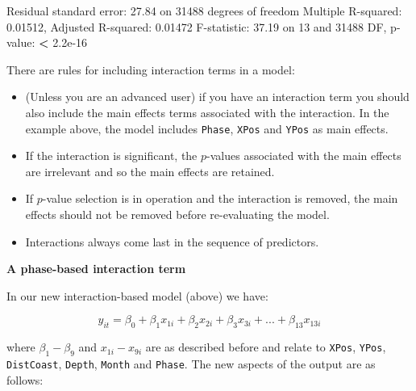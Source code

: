 \documentclass[
  oneside]{krantz}
\newenvironment{Shaded}{\begin{snugshade}}{\end{snugshade}}
\newcommand{\DecValTok}[1]{\textcolor[rgb]{0.00,0.00,0.81}{#1}}
\newcommand{\ErrorTok}[1]{\textcolor[rgb]{0.64,0.00,0.00}{\textbf{#1}}}
\newcommand{\FloatTok}[1]{\textcolor[rgb]{0.00,0.00,0.81}{#1}}
\newcommand{\NormalTok}[1]{#1}
\newcommand{\SpecialCharTok}[1]{\textcolor[rgb]{0.00,0.00,0.00}{#1}}
\begin{document}
\begin{Shaded}
\begin{Highlighting}[]
\NormalTok{Residual standard error}\SpecialCharTok{:} \FloatTok{27.84}\NormalTok{ on }\DecValTok{31488}\NormalTok{ degrees of freedom}
\NormalTok{Multiple R}\SpecialCharTok{{-}}\NormalTok{squared}\SpecialCharTok{:}  \FloatTok{0.01512}\NormalTok{,   Adjusted R}\SpecialCharTok{{-}}\NormalTok{squared}\SpecialCharTok{:}  \FloatTok{0.01472} 
\NormalTok{F}\SpecialCharTok{{-}}\NormalTok{statistic}\SpecialCharTok{:} \FloatTok{37.19}\NormalTok{ on }\DecValTok{13}\NormalTok{ and }\DecValTok{31488}\NormalTok{ DF,  p}\SpecialCharTok{{-}}\NormalTok{value}\SpecialCharTok{:} \ErrorTok{\textless{}} \FloatTok{2.2e{-}16}
\end{Highlighting}
\end{Shaded}

\normalsize

There are rules for including interaction terms in a model:

\begin{itemize}
\item
  (Unless you are an advanced user) if you have an interaction term you should also include the main effects terms associated with the interaction. In the example above, the model includes \texttt{Phase}, \texttt{XPos} and \texttt{YPos} as main effects.
\item
  If the interaction is significant, the \(p\)-values associated with the main effects are irrelevant and so the main effects are retained.
\item
  If \(p\)-value selection is in operation and the interaction is removed, the main effects should not be removed before re-evaluating the model.
\item
  Interactions always come last in the sequence of predictors.
\end{itemize}

\textbf{A phase-based interaction term}

In our new interaction-based model (above) we have:

\begin{equation}
y_{it}=\beta_{0}+\beta_1x_{1i}+\beta_2x_{2i}+\beta_3x_{3i}+...+\beta_{13}x_{13i}
\end{equation}

where \(\beta_{1}-\beta_9\) and \(x_{1i}-x_{9i}\) are as described before and relate to \texttt{XPos}, \texttt{YPos}, \texttt{DistCoast}, \texttt{Depth}, \texttt{Month} and \texttt{Phase}. The new aspects of the output are as follows:
\end{document}
